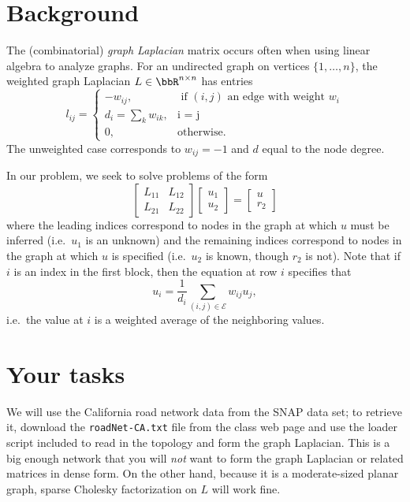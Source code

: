 \documentclass[12pt, leqno]{article}
\begin{document}
\section*{Background}

The (combinatorial) {\em graph Laplacian} matrix occurs often when
using linear algebra to analyze graphs.  For an undirected graph on
vertices $\{1, \ldots, n\}$, the weighted graph
Laplacian $L \in \bbR^{n \times n}$ has entries
\[
  l_{ij} = \begin{cases}
    -w_{ij}, & \mbox{ if } (i,j) \mbox{ an edge with weight } w_i \\
    d_{i} = \sum_k w_{ik}, & \mbox{i = j} \\
    0, & \mbox{otherwise}.
  \end{cases}
\]
The unweighted case corresponds to $w_{ij} = -1$ and $d$ equal to the
node degree.

In our problem, we seek to solve problems of the form
\[
  \begin{bmatrix}
    L_{11} & L_{12} \\
    L_{21} & L_{22}
  \end{bmatrix}
  \begin{bmatrix} u_1 \\ u_2 \end{bmatrix} =
  \begin{bmatrix} u \\ r_2 \end{bmatrix}
\]
where the leading indices correspond to nodes in the graph at which
$u$ must be inferred (i.e.~$u_1$ is an unknown) and the remaining
indices correspond to nodes in the graph at which $u$ is specified
(i.e.~$u_2$ is known, though $r_2$ is not).  Note that if $i$ is an
index in the first block, then the equation at row $i$ specifies that
\[
  u_i = \frac{1}{d_i} \sum_{(i,j) \in \mathcal{E}} w_{ij} u_j,
\]
i.e.~the value at $i$ is a weighted average of the neighboring values.

\section*{Your tasks}

We will use the California road network data from the SNAP data set; to
retrieve it, download the {\tt roadNet-CA.txt} file from the class web
page and use the loader script included to read in the topology and form
the graph Laplacian. This is a big enough network that you will {\em
not} want to form the graph Laplacian or related matrices in dense form.
On the other hand, because it is a moderate-sized planar graph, sparse
Cholesky factorization on $L$ will work fine.
\end{document}

